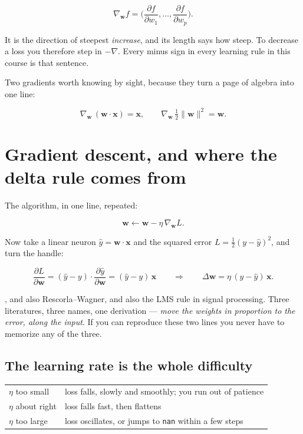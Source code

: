 \documentclass[11pt]{article}
\begin{document}
\[
\nabla_{\boldsymbol{w}} f =
\Big(\frac{\partial f}{\partial w_1}, \dots, \frac{\partial f}{\partial w_p}\Big).
\]

\begin{keybox}
 It is the direction of steepest \emph{increase},
and its length says how steep. To decrease a loss you therefore step in
$-\nabla$. Every minus sign in every learning rule in this course is that
sentence.
\end{keybox}

Two gradients worth knowing by sight, because they turn a page of algebra into
one line:

\[
\nabla_{\boldsymbol{w}}\,(\boldsymbol{w}\cdot\boldsymbol{x}) = \boldsymbol{x},
\qquad
\nabla_{\boldsymbol{w}}\,\tfrac{1}{2}\|\boldsymbol{w}\|^2 = \boldsymbol{w}.
\]

\section{Gradient descent, and where the delta rule comes from}

The algorithm, in one line, repeated:

\[
\boldsymbol{w} \leftarrow \boldsymbol{w} - \eta\,\nabla_{\boldsymbol{w}} L .
\]

Now take a linear neuron $\hat{y} = \boldsymbol{w}\cdot\boldsymbol{x}$ and the
squared error $L = \tfrac{1}{2}(y - \hat{y})^2$, and turn the handle:

\[
\frac{\partial L}{\partial \boldsymbol{w}}
= (\hat{y} - y)\cdot \frac{\partial \hat{y}}{\partial \boldsymbol{w}}
= (\hat{y} - y)\,\boldsymbol{x}
\qquad\Longrightarrow\qquad
\Delta \boldsymbol{w} = \eta\,(y - \hat{y})\,\boldsymbol{x}.
\]

\begin{keybox}
, and also Rescorla--Wagner, and also the LMS rule
in signal processing. Three literatures, three names, one derivation ---
\emph{move the weights in proportion to the error, along the input}. If you can
reproduce these two lines you never have to memorize any of the three.
\end{keybox}

\subsection{The learning rate is the whole difficulty}

\begin{center}
\begin{tabular}{@{}ll@{}}
\toprule
$\eta$ too small & loss falls, slowly and smoothly; you run out of patience \\
$\eta$ about right & loss falls fast, then flattens \\
$\eta$ too large & loss oscillates, or jumps to \texttt{nan} within a few steps \\
\bottomrule
\end{tabular}
\end{center}
\end{document}

